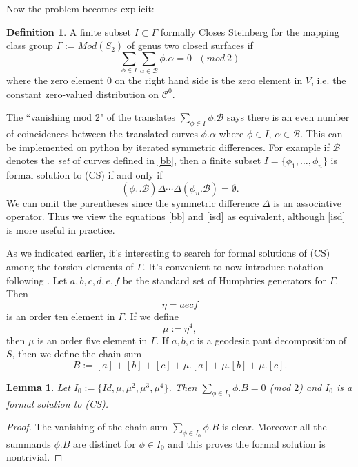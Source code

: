 \documentclass[12pt]{amsart}
\newtheorem{lem}[thm]{Lemma}
\theoremstyle{definition}
\newtheorem{dfn}[thm]{Definition}
\theoremstyle{remark}
\newcommand{\sB}{\mathscr{B}}
\newcommand{\sC}{\mathscr{C}}
\begin{document}
Now the problem becomes explicit: 
\begin{dfn}
A finite subset $I\subset \Gamma$ formally Closes Steinberg for the mapping class group $\Gamma:=Mod(S_2)$ of genus two closed surfaces if 
\begin{equation}
\sum_{\phi\in I} \sum_{\alpha\in \sB}\phi.\alpha=0 ~~~(mod~2)
\end{equation}
where the zero element $0$ on the right hand side is the zero element in $V$, i.e. the constant zero-valued distribution on $\sC^0$. 
\end{dfn}

The ``vanishing mod $2$" of the translates $\sum_{\phi\in I} \phi.\sB$ says there is an even number of coincidences between the translated curves $\phi.\alpha$ where $\phi\in I$, $\alpha\in \sB$. This can be implemented on python by iterated symmetric differences. For example if $\sB$ denotes the \emph{set} of curves defined in \eqref{bb}, then a finite subset $I=\{\phi_1, \ldots, \phi_n\}$ is formal solution to (CS) if and only if \begin{equation}\label{isd} (\phi_1. \sB) \Delta \cdots \Delta (\phi_n.\sB) = \emptyset.\end{equation} We can omit the parentheses since the symmetric difference $\Delta$ is an associative operator. Thus we view the equations \eqref{bb} and \eqref{isd} as equivalent, although \eqref{isd} is more useful in practice.

As we indicated earlier, it's interesting to search for formal solutions of (CS) among the torsion elements of $\Gamma$. It's convenient to now introduce notation following \cite{nakamura}. Let $a,b,c,d,e,f$ be the standard set of Humphries generators for $\Gamma$. Then $$\eta=aecf$$ is an order ten element in $\Gamma$. If we define $$\mu:=\eta^4,$$ then $\mu$ is an order five element in $\Gamma$. If $a,b,c$ is a geodesic pant decomposition of $S$, then we define the chain sum $$B:=[a]+[b]+[c]+\mu.[a]+\mu.[b]+\mu.[c].$$

\begin{lem}
Let $I_0:=\{Id, \mu, \mu^2, \mu^3, \mu^4\}$. Then $\sum_{\phi \in I_0} \phi.B=0$ (mod $2$) and $I_0$ is a formal solution to (CS). 
\end{lem}
\begin{proof}
The vanishing of the chain sum $\sum_{\phi \in I_0} \phi.B$ is clear. Moreover all the summands $\phi.B$ are distinct for $\phi \in I_0$ and this proves the formal solution is nontrivial.
\end{proof}
\end{document}
